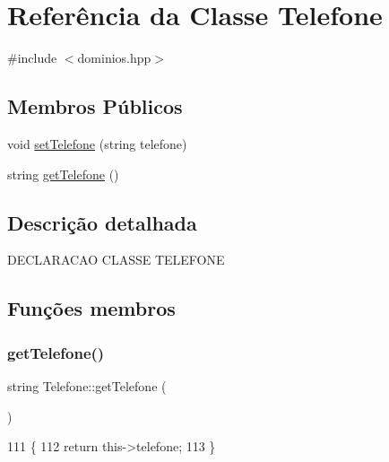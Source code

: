 \hypertarget{class_telefone}{}\section{Referência da Classe Telefone}
\label{class_telefone}


{\ttfamily \#include $<$dominios.\+hpp$>$}

\subsection*{Membros Públicos}
\begin{DoxyCompactItemize}
\item 
void \mbox{\hyperlink{class_telefone_ad85910fc35320e4a8e7ede8d40bbc454}{set\+Telefone}} (string telefone)
\item 
string \mbox{\hyperlink{class_telefone_a3e7acb7a3b658ef9e5d73b7e1d2948e7}{get\+Telefone}} ()
\end{DoxyCompactItemize}


\subsection{Descrição detalhada}
D\+E\+C\+L\+A\+R\+A\+C\+AO C\+L\+A\+S\+SE T\+E\+L\+E\+F\+O\+NE 

\subsection{Funções membros}
\mbox{\label{class_telefone_a3e7acb7a3b658ef9e5d73b7e1d2948e7}} 
\subsubsection{\texorpdfstring{get\+Telefone()}{getTelefone()}}
{\footnotesize\ttfamily string Telefone\+::get\+Telefone (\begin{DoxyParamCaption}{ }\end{DoxyParamCaption})}


\begin{DoxyCode}
111 \{
112   \textcolor{keywordflow}{return} this->telefone;
113 \}
\end{DoxyCode}
\mbox{\label{class_telefone_ad85910fc35320e4a8e7ede8d40bbc454}} 
